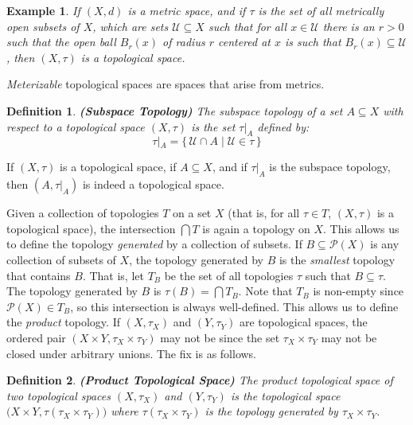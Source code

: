 \documentclass{article}
\theoremstyle{plain}
\theoremstyle{normal}
\newtheorem{definition}{Definition}[section]
\newtheorem{example}{Example}[section]
\begin{document}
        \begin{example}
            If $(X,d)$ is a metric space, and if $\tau$ is the set of all
            \textit{metrically open} subsets of $X$, which are sets
            $\mathcal{U}\subseteq{X}$ such that for all $x\in\mathcal{U}$ there
            is an $r>0$ such that the open ball $B_{r}(x)$ of radius $r$
            centered at $x$ is such that $B_{r}(x)\subseteq\mathcal{U}$, then
            $(X,\tau)$ is a topological space.
        \end{example}
        \textit{Meterizable} topological spaces are spaces that arise from
        metrics.
        \begin{definition}{\textbf{(Subspace Topology)}}
            The subspace topology of a set $A\subseteq{X}$ with respect to a
            topological space $(X,\tau)$ is the set $\tau|_{A}$ defined by:
            \begin{equation}
                \tau|_{A}=\{\,\mathcal{U}\cap{A}\;|\;\mathcal{U}\in\tau\,\}
            \end{equation}
        \end{definition}
        If $(X,\tau)$ is a topological space, if $A\subseteq{X}$, and if
        $\tau|_{A}$ is the subspace topology, then $(A,\tau|_{A})$ is indeed
        a topological space.
        \par\hfill\par
        Given a collection of topologies $T$ on a set $X$ (that is, for all
        $\tau\in{T}$, $(X,\tau)$ is a topological space), the intersection
        $\bigcap{T}$ is again a topology on $X$. This allows us to define the
        topology \textit{generated} by a collection of subsets. If
        $B\subseteq\mathcal{P}(X)$ is any collection of subsets of $X$, the
        topology generated by $B$ is the \textit{smallest} topology that
        contains $B$. That is, let $T_{B}$ be the set of all topologies
        $\tau$ such that $B\subseteq\tau$. The topology generated by
        $B$ is $\tau(B)=\bigcap{T}_{B}$. Note that $T_{B}$ is non-empty since
        $\mathcal{P}(X)\in{T}_{B}$, so this intersection is always well-defined.
        This allows us to define the \textit{product} topology. If
        $(X,\tau_{X})$ and $(Y,\tau_{Y})$ are topological spaces, the ordered
        pair $(X\times{Y},\tau_{X}\times\tau_{Y})$ may not be since the set
        $\tau_{X}\times\tau_{Y}$ may not be closed under arbitrary unions.
        The fix is as follows.
        \begin{definition}{\textbf{(Product Topological Space)}}
            The product topological space of two topological spaces
            $(X,\tau_{X})$ and $(Y,\tau_{Y})$ is the topological space
            $\big(X\times{Y},\tau(\tau_{X}\times\tau_{Y})\big)$ where
            $\tau(\tau_{X}\times\tau_{Y})$ is the topology generated by
            $\tau_{X}\times\tau_{Y}$.
        \end{definition}
\end{document}
